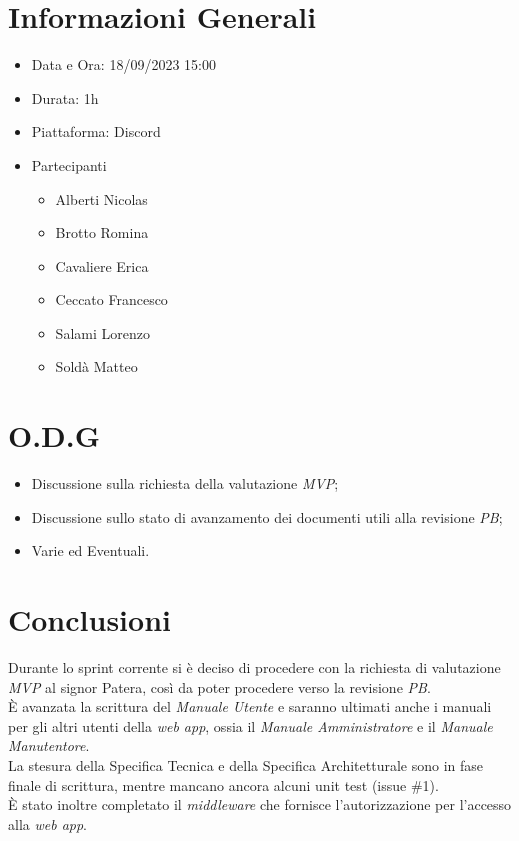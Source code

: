 \documentclass[a4paper, 12pt]{article}
\begin{document}
\makefrontpage

\section*{Informazioni Generali}
\begin{itemize}
    \item Data e Ora: 18/09/2023 15:00
    \item Durata: 1h
    \item Piattaforma: Discord
    \item Partecipanti
          \begin{itemize}
              \item Alberti Nicolas
              \item Brotto Romina
              \item Cavaliere Erica
              \item Ceccato Francesco
              \item Salami Lorenzo
              \item Soldà Matteo
          \end{itemize}
\end{itemize}

\section*{O.D.G}
\begin{itemize}
    \item Discussione sulla richiesta della valutazione \textit{MVP};
    \item Discussione sullo stato di avanzamento dei documenti utili alla
          revisione \textit{PB};
    \item Varie ed Eventuali.
\end{itemize}

\section*{Conclusioni}
Durante lo sprint corrente si è deciso di procedere con la richiesta di
valutazione \textit{MVP} al signor Patera, così da poter procedere verso la
revisione \textit{PB}.\\
È avanzata la scrittura del \textit{Manuale Utente} e saranno ultimati anche i
manuali per gli altri utenti della \textit{web app}, ossia il \textit{Manuale
    Amministratore} e il \textit{Manuale Manutentore}.\\
La stesura della Specifica Tecnica e della Specifica Architetturale sono in fase
finale di scrittura, mentre mancano ancora alcuni unit test (issue \#1).\\
È stato inoltre completato il \textit{middleware} che fornisce l'autorizzazione per l'accesso alla \textit{web app}.\\
\end{document}
